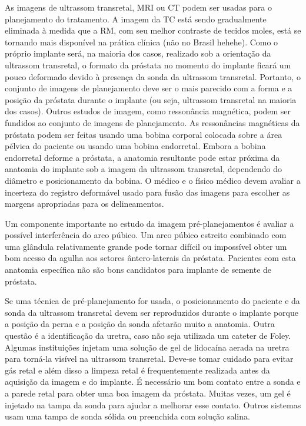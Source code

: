 \documentclass[11pt,a4paper]{article}
\begin{document}
	As imagens de ultrassom transretal, MRI ou CT podem ser usadas para o planejamento do tratamento. A imagem da TC está sendo gradualmente eliminada à medida que a RM, com seu melhor contraste de tecidos moles, está se tornando mais disponível na prática clínica (não no Brasil hehehe). Como o próprio implante será, na maioria dos casos, realizado sob a orientação da ultrassom transretal, o formato da próstata no momento do implante ficará um pouco deformado devido à presença da sonda da ultrassom transretal. Portanto, o conjunto de imagens de planejamento deve ser o mais parecido com a forma e a posição da próstata durante o implante (ou seja, ultrassom transretal na maioria dos casos). Outros estudos de imagem, como ressonância magnética, podem ser fundidos ao conjunto de imagens de planejamento. As ressonâncias magnéticas da próstata podem ser feitas usando uma bobina corporal colocada sobre a área pélvica do paciente ou usando uma bobina endorretal. Embora a bobina endorretal deforme a próstata, a anatomia resultante pode estar próxima da anatomia do implante sob a imagem da ultrassom transretal, dependendo do diâmetro e posicionamento da bobina. O médico e o físico médico devem avaliar a incerteza do registro deformável usado para fusão das imagens para escolher as margens apropriadas para os delineamentos.

	Um componente importante no estudo da imagem pré-planejamentos é avaliar a possível interferência do arco púbico. Um arco púbico estreito combinado com uma glândula relativamente grande pode tornar difícil ou impossível obter um bom acesso da agulha aos setores ântero-laterais da próstata. Pacientes com esta anatomia específica não são bons candidatos para implante de semente de próstata.

	Se uma técnica de pré-planejamento for usada, o posicionamento do paciente e da sonda da ultrassom transretal devem ser reproduzidos durante o implante porque a posição da perna e a posição da sonda afetarão muito a anatomia. Outra questão é a identificação da uretra, caso não seja utilizada um cateter de Foley. Algumas instituições injetam uma solução de gel de lidocaína aerada na uretra para torná-la visível na ultrassom transretal. Deve-se tomar cuidado para evitar gás retal e além disso a limpeza retal é frequentemente realizada antes da aquisição da imagem e do implante. É necessário um bom contato entre a sonda e a parede retal para obter uma boa imagem da próstata. Muitas vezes, um gel é injetado na tampa da sonda para ajudar a melhorar esse contato. Outros sistemas usam uma tampa de sonda sólida ou preenchida com solução salina.
	
\end{document}
